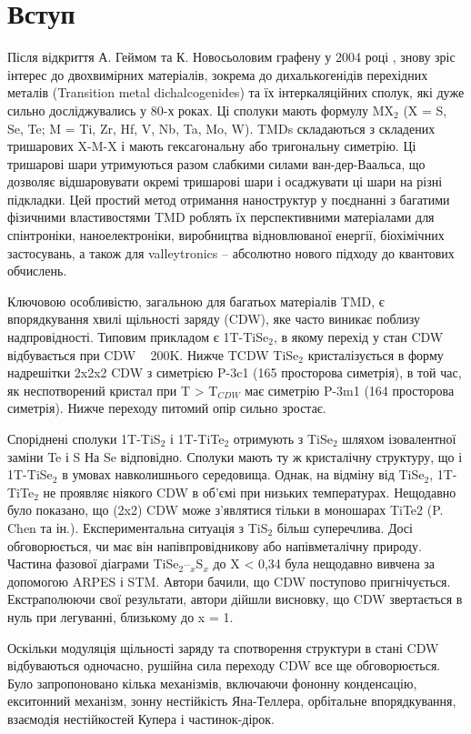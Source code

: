 \chapter{Вступ}
Після відкриття А. Геймом та К. Новосьоловим графену у 2004 році \cite{Graphene}, знову зріс інтерес до двохвимірних матеріалів, зокрема до дихалькогенідів перехідних металів (Transition metal dichalcogenides) та їх інтеркаляційних сполук, які дуже сильно досліджувались у 80-х роках. Ці сполуки мають формулу MX$_{2}$ (X = S, Se, Te; M = Ti, Zr, Hf, V, Nb, Ta, Mo, W). TMDs складаються з складених тришарових X-M-X і мають гексагональну або тригональну симетрію. Ці тришарові шари утримуються разом слабкими силами ван-дер-Ваальса, що дозволяє відшаровувати окремі тришарові шари і осаджувати ці шари на різні підкладки. Цей простий метод отримання наноструктур у поєднанні з багатими фізичними властивостями TMD роблять їх перспективними матеріалами для спінтроніки, наноелектроніки, виробництва відновлюваної енергії, біохімічних застосувань, а також для valleytronics – абсолютно нового підходу до квантових обчислень.

Ключовою особливістю, загальною для багатьох матеріалів TMD, є впорядкування хвилі щільності заряду (CDW), яке часто виникає поблизу надпровідності. Типовим прикладом є 1T-TiSe$_2$, в якому перехід у стан CDW відбувається при CDW ~ 200K. Нижче TCDW TiSe$_2$ кристалізується в форму надрешітки 2x2x2 CDW з симетрією P-3c1 (165 просторова симетрія), в той час, як неспотворений кристал при T > T$_{CDW}$ має симетрію P-3m1 (164 просторова симетрія). Нижче переходу питомий опір сильно зростає.

Споріднені сполуки 1T-TiS$_2$ і 1T-TiTe$_2$ отримують з TiSe$_2$ шляхом ізовалентної заміни Te і S На Se відповідно. Сполуки мають ту ж кристалічну структуру, що і 1T-TiSe$_2$ в умовах навколишнього середовища. Однак, на відміну від TiSe$_2$, 1T-TiTe$_2$ не проявляє ніякого CDW в об'ємі при низьких температурах. Нещодавно було показано, що (2x2) CDW може з'являтися тільки в моношарах TiTe2 (P. Chen та ін.). Експериментальна ситуація з TiS$_2$ більш суперечлива. Досі обговорюється, чи має він напівпровідникову або напівметалічну природу. Частина фазової діаграми TiSe$_2$--$_x$S$_x$ до X < 0,34 була нещодавно вивчена за допомогою ARPES і STM. Автори бачили, що CDW поступово пригнічується. Екстраполюючи свої результати, автори дійшли висновку, що CDW звертається в нуль при легуванні, близькому до x = 1.

Оскільки модуляція щільності заряду та спотворення структури в стані CDW відбуваються одночасно, рушійна сила переходу CDW все ще обговорюється. Було запропоновано кілька механізмів, включаючи фононну конденсацію, екситонний механізм, зонну нестійкість Яна-Теллера, орбітальне впорядкування, взаємодія нестійкостей Купера і частинок-дірок.

